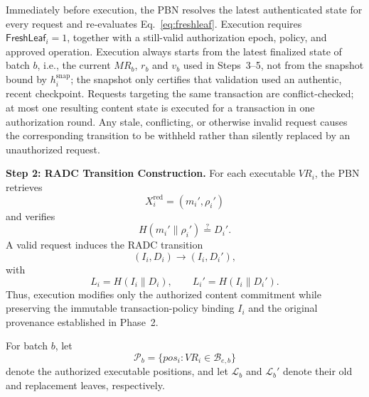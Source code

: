 \documentclass[lettersize,journal]{IEEEtran}
\begin{document}
Immediately before execution, the PBN resolves the latest authenticated
state for every request and \textcolor{e1}{re-evaluates
Eq.~\eqref{eq:freshleaf}.}
Execution requires
\textcolor{e1}{$\mathsf{FreshLeaf}_i=1$},
together with a still-valid authorization epoch, policy, and approved
operation. \textcolor{e1}{Execution always starts from the latest
finalized state of batch $b$, i.e., the current $MR_b$, $r_b$ and $v_b$
used in Steps~3--5, not from the snapshot bound by $h_i^{\mathrm{snap}}$;
the snapshot only certifies that validation used an authentic, recent
checkpoint.} Requests targeting the same transaction are conflict-checked;
at most one resulting content state is executed for a transaction in
one authorization round. Any stale, conflicting, or otherwise invalid
request causes the corresponding transition to be withheld rather than
silently replaced by an unauthorized request.

\medskip
\noindent\textbf{Step 2: RADC Transition Construction.}
For each executable $VR_i$, the PBN retrieves
\begin{equation}
X_i^{\mathrm{red}}=(m_i',\rho_i')
\end{equation}
and verifies
\begin{equation}
H(m_i'\parallel\rho_i')
\stackrel{?}{=}D_i'.
\end{equation}
A valid request induces the RADC transition
\begin{equation}
(I_i,D_i)\longrightarrow(I_i,D_i'),
\end{equation}
with
\begin{equation}
L_i=H(I_i\parallel D_i),
\qquad
L_i'=H(I_i\parallel D_i').
\end{equation}
Thus, execution modifies only the authorized content commitment while
preserving the immutable transaction-policy binding $I_i$ and the
original provenance established in Phase~2.

For batch $b$, let
\begin{equation}
\mathcal{P}_b=
\{pos_i:VR_i\in\mathcal{B}_{e,b}\}
\end{equation}
denote the authorized executable positions, and let
$\mathcal{L}_b$ and $\mathcal{L}_b'$ denote their old and replacement
leaves, respectively.
\end{document}
